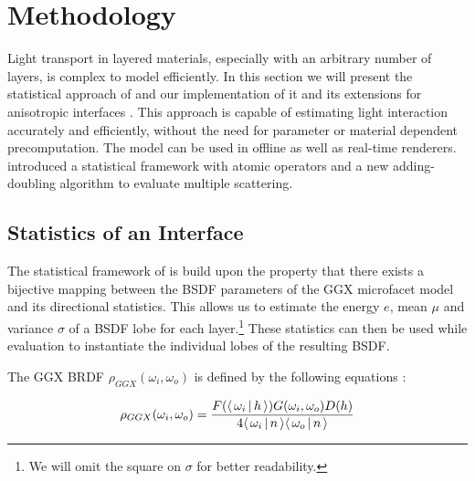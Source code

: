 \section{Methodology}
\label{sec:methodology}

Light transport in layered materials, especially with an arbitrary number of layers, is complex to model efficiently. In this section we will present the statistical approach of \textcite{belcour2018} and our implementation of it and its extensions for anisotropic interfaces \parencite{yamaguchi2019,weier2020}. This approach is capable of estimating light interaction accurately and efficiently, without the need for parameter or material dependent precomputation. The model can be used in offline as well as real-time renderers. \textcite{belcour2018} introduced a statistical framework with atomic operators and a new adding-doubling algorithm to evaluate multiple scattering.

\subsection{Statistics of an Interface}
\label{sec:interface_statistics}

The statistical framework of \textcite{belcour2018} is build upon the property that there exists a bijective mapping between the BSDF parameters of the GGX microfacet model \parencite{walter2007} and its directional statistics. This allows us to estimate the energy $e$, mean $\mu$ and variance $\sigma$ of a BSDF lobe for each layer.\footnote{We will omit the square on $\sigma$ for better readability.} These statistics can then be used while evaluation to instantiate the individual lobes of the resulting BSDF.

%

The GGX BRDF $\rho_{GGX}(\omega_i, \omega_o)$ is defined by the following equations \parencite{walter2007,heitz2014}:

\begin{equation} \label{eq:ggx_brfd}
        \rho_{GGX}(\omega_i, \omega_o) = \frac{F(\dotproduct{\omega_i}{h}) G(\omega_i, \omega_o) D(h)}{4 \dotproduct{\omega_i}{n} \dotproduct{\omega_o}{n}}\\
\end{equation}

